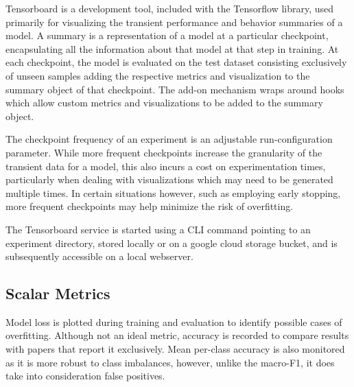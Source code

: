 \documentclass[../../fyp.tex]{subfiles}
\begin{document}
Tensorboard is a development tool, included with the Tensorflow library, used primarily for visualizing the transient performance and behavior summaries of a model. A summary is a representation of a model at a particular checkpoint, encapsulating all the information about that model at that step in training. At each checkpoint, the model is evaluated on the test dataset consisting exclusively of unseen samples adding the respective metrics and visualization to the summary object of that checkpoint. The add-on mechanism wraps around hooks which allow custom metrics and visualizations to be added to the summary object.

 The checkpoint frequency of an experiment is an adjustable run-configuration parameter. While more frequent checkpoints increase the granularity of the transient data for a model, this also incurs a cost on experimentation times, particularly when dealing with visualizations which may need to be generated multiple times. In certain situations however, such as employing early stopping, more frequent checkpoints may help minimize the risk of overfitting.
 
 The Tensorboard service is started using a CLI command pointing to an experiment directory, stored locally or on a google cloud storage bucket, and is subsequently accessible on a local webserver.   

\subsection{Scalar Metrics}
Model loss is plotted during training and evaluation to identify possible cases of overfitting. Although not an ideal metric, accuracy is recorded to compare results with papers that report it exclusively. Mean per-class accuracy is also monitored as it is more robust to class imbalances, however, unlike the macro-F1, it does take into consideration false positives. 
\end{document}
